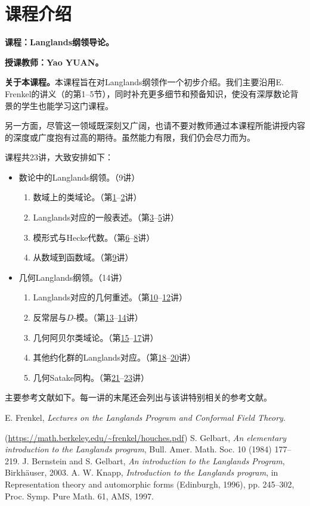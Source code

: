 \chapter{课程介绍}\label{preface}
\textbf{课程：Langlands纲领导论。}\par
\textbf{授课教师：Yao YUAN。}

\textbf{关于本课程。}本课程旨在对Langlands纲领作一个初步介绍。我们主要沿用E. Frenkel的讲义（的第1--5节），同时补充更多细节和预备知识，使没有深厚数论背景的学生也能学习这门课程。

另一方面，尽管这一领域既深刻又广阔，也请不要对教师通过本课程所能讲授内容的深度或广度抱有过高的期待。虽然能力有限，我们仍会尽力而为。

课程共23讲，大致安排如下：
\begin{itemize}
\item 数论中的Langlands纲领。（9讲）
\begin{enumerate}
\item 数域上的类域论。（第\hyperref[L1]{1}--\hyperref[L2]{2}讲）
\item Langlands对应的一般表述。（第\hyperref[L3]{3}--\hyperref[L5]{5}讲）
\item 模形式与Hecke代数。（第\hyperref[L6]{6}--\hyperref[L8]{8}讲）
\item 从数域到函数域。（第\hyperref[L9]{9}讲）
\end{enumerate}
\item 几何Langlands纲领。（14讲）
\begin{enumerate}
\item Langlands对应的几何重述。（第\hyperref[L10]{10}--\hyperref[L12]{12}讲）
\item 反常层与$D$-模。（第\hyperref[L13]{13}--\hyperref[L14]{14}讲）
\item 几何阿贝尔类域论。（第\hyperref[L15]{15}--\hyperref[L17]{17}讲）
\item 其他约化群的Langlands对应。（第\hyperref[L18]{18}--\hyperref[L20]{20}讲）
\item 几何Satake同构。（第\hyperref[L21]{21}--\hyperref[L23]{23}讲）
\end{enumerate}
\end{itemize}

主要参考文献如下。每一讲的末尾还会列出与该讲特别相关的参考文献。
\begin{references}
 E. Frenkel, \textit{Lectures on the Langlands Program and Conformal Field Theory}.\par (\url{https://math.berkeley.edu/~frenkel/houches.pdf})
 S. Gelbart, \textit{An elementary introduction to the Langlands program}, Bull. Amer. Math. Soc. 10 (1984) 177--219.
 J. Bernstein and S. Gelbart, \textit{An introduction to the Langlands Program}, Birkh\"auser, 2003.
 A. W. Knapp, \textit{Introduction to the Langlands program}, in Representation theory and automorphic forms (Edinburgh, 1996), pp. 245--302, Proc. Symp. Pure Math. 61, AMS, 1997.
\end{references}
